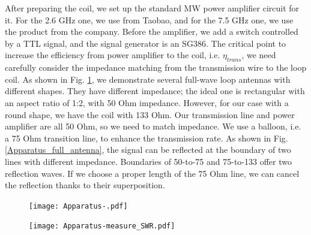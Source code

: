 After preparing the coil, we set up the standard MW power amplifier circuit for it. For the 2.6 GHz one, we use \href{}{} from Taobao, and for the 7.5 GHz one, we use the product from the company. Before the amplifier, we add a switch controlled by a TTL signal, and the signal generator is an SG386. The critical point to increase the efficiency from power amplifier to the coil, i.e. \(\eta_{trans}\), we need carefully consider the impedance matching from the transmission wire to the loop coil. As shown in Fig. \ref{Apparatus_full_impedance}, we demonstrate several full-wave loop antennas with different shapes. They have different impedance; the ideal one is rectangular with an aspect ratio of 1:2, with 50 Ohm impedance. However, for our case with a round shape, we have the coil with 133 Ohm. Our transmission line and power amplifier are all 50 Ohm, so we need to match impedance. We use a balloon, i.e. a 75 Ohm transition line, to enhance the transmission rate. As shown in Fig. \ref{Apparatus_full_antenna}, the signal can be reflected at the boundary of two lines with different impedance. Boundaries of 50-to-75 and 75-to-133 offer two reflection waves. If we choose a proper length of the 75 Ohm line, we can cancel the reflection thanks to their superposition. 

\begin{figure}[htb]
\begin{center}
\texttt{[image: Apparatus-.pdf]}
\end{center}
\caption[]{}  
\label{Apparatus_full_impedance}
\end{figure}

\begin{figure}[htb]
\begin{center}
\texttt{[image: Apparatus-measure\_SWR.pdf]}
\end{center}
\caption{}
\label{SWR_measure_method}
\end{figure}

